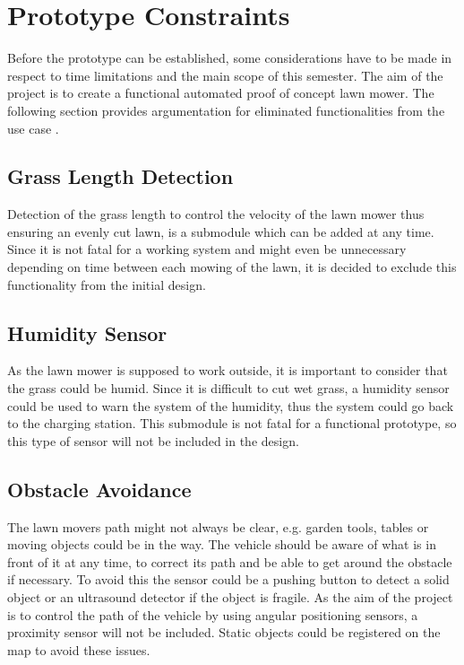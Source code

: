 \section{Prototype Constraints}\label{sec:PrototypeConstraints}
Before the prototype can be established, some considerations have to be made in respect to time limitations and the main scope of this semester. The aim of the project is to create a functional automated proof of concept lawn mower. The following section provides argumentation for eliminated functionalities from the use case .

\subsection{Grass Length Detection}
Detection of the grass length to control the velocity of the lawn mower thus ensuring an evenly cut lawn, is a submodule which can be added at any time. Since it is not fatal for a working system and might even be unnecessary depending on time between each mowing of the lawn, it is decided to exclude this functionality from the initial design.

\subsection{Humidity Sensor}
As the lawn mower is supposed to work outside, it is important to consider that the grass could be humid. Since it is difficult to cut wet grass, a humidity sensor could be used to warn the system of the humidity, thus the system could go back to the charging station. This submodule is not fatal for a functional prototype, so this type of sensor will not be included in the design.

\subsection{Obstacle Avoidance}
The lawn movers path might not always be clear, e.g. garden tools, tables or moving objects could be in the way. The vehicle should be aware of what is in front of it at any time, to correct its path and be able to get around the obstacle if necessary. To avoid this the sensor could be a pushing button to detect a solid object or an ultrasound detector if the object is fragile.
As the aim of the project is to control the path of the vehicle by using angular positioning sensors, a proximity sensor will not be included. Static objects could be registered on the map to avoid these issues.

